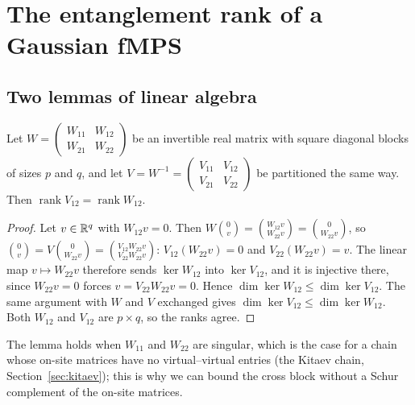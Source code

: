 \section{The entanglement rank of a Gaussian fMPS}
\label{sec:entrank}

\subsection{Two lemmas of linear algebra}
\begin{lemma}\label{lem:nullity}
Let $W=\begin{pmatrix}W_{11}&W_{12}\\W_{21}&W_{22}\end{pmatrix}$ be an invertible real matrix with square diagonal
blocks of sizes $p$ and $q$, and let $V=W^{-1}=\begin{pmatrix}V_{11}&V_{12}\\V_{21}&V_{22}\end{pmatrix}$
be partitioned the same way. Then $\operatorname{rank}V_{12}=\operatorname{rank}W_{12}$.
\end{lemma}
\begin{proof}
Let $v\in\mathbb R^q$ with $W_{12}v=0$. Then $W\binom{0}{v}=\binom{W_{12}v}{W_{22}v}=\binom{0}{W_{22}v}$, so
$\binom0v=V\binom{0}{W_{22}v}=\binom{V_{12}W_{22}v}{V_{22}W_{22}v}$: $V_{12}(W_{22}v)=0$ and $V_{22}(W_{22}v)=v$. The
linear map $v\mapsto W_{22}v$ therefore sends $\ker W_{12}$ into $\ker V_{12}$, and it is injective there,
since $W_{22}v=0$ forces $v=V_{22}W_{22}v=0$. Hence $\dim\ker W_{12}\leq\dim\ker V_{12}$. The same argument
with $W$ and $V$ exchanged gives $\dim\ker V_{12}\leq\dim\ker W_{12}$. Both $W_{12}$ and $V_{12}$ are
$p\times q$, so the ranks agree.
\end{proof}
The lemma holds when $W_{11}$ and $W_{22}$ are singular, which is the case for a chain whose on-site
matrices have no virtual--virtual entries (the Kitaev chain, Section~\ref{sec:kitaev}); this is
why we can bound the cross block without a Schur complement of the on-site matrices.

